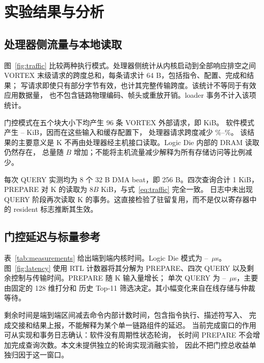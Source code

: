 \documentclass[conference,a4paper]{IEEEtran}
\begin{document}
\section{实验结果与分析}
\subsection{处理器侧流量与本地读取}
图~\ref{fig:traffic} 比较两种执行模式。处理器侧统计从内核启动到全部响应排空之间
VORTEX 末级请求的跨度总和，每条请求计 64 B，包括指令、配置、完成和结果；
写请求即使只有部分字节有效，也计其完整传输跨度。该统计不等同于有效应用数据量，
也不包含链路物理编码、帧头或重放开销。loader 事务不计入该项统计。

门控模式在五个块大小下均产生 96 条 VORTEX 外部请求，即 \HostGateKiB{} KiB。
软件模式产生 \HostSoftMinKiB{}--\HostSoftMaxKiB{} KiB，因而在这些输入和缓存配置下，
处理器请求跨度减少 \HostReductionMin{}\%--\HostReductionMax{}\%。
该结果的主要意义是 K 不再由处理器经主机接口读取。Logic Die 内部的 DRAM 读取仍然存在，
总量随 $B$ 增加；不能将主机流量减少解释为所有存储访问等比例减少。

每次 QUERY 实测均为 8 个 32 B DMA beat，即 256 B。四次查询合计 1 KiB，
PREPARE 对 K 的读取为 $8B$ KiB，与式~\eqref{eq:traffic} 完全一致。
日志中未出现 QUERY 阶段再次读取 K 的事务。这直接检验了驻留复用，而不是仅以寄存器中的
resident 标志推断其生效。



\subsection{门控延迟与标量参考}
表~\ref{tab:measurements} 给出端到端内核时间。Logic Die 模式为
\GateMinUs{}--\GateMaxUs{}~$\mu$s。图~\ref{fig:latency} 使用 RTL 计数器将其分解为
PREPARE、四次 QUERY 以及剩余控制与传输时间。PREPARE 随 K 输入量增长；
单次 QUERY 为 \QueryMinUs{}--\QueryMaxUs{}~$\mu$s，主要由固定的 128 维打分和
历史 Top-11 筛选决定。其小幅变化来自在线存储与仲裁等待。

剩余时间是端到端区间减去命令内部计数时间，包含指令执行、描述符写入、
完成交接和结果上报，不能解释为某个单一链路组件的延迟。
当前完成窗口的作用可从实现和事务日志确认：软件没有周期性状态轮询，
长时间 PREPARE 不会增加完成查询次数。本文未提供独立的轮询实现消融实验，
因此不把门控总收益单独归因于这一窗口。

\begin{table}[t]
\caption{成对实测结果：总时间包含一次准备与四次查询}
\label{tab:measurements}\centering\scriptsize

\end{table}
\end{document}
